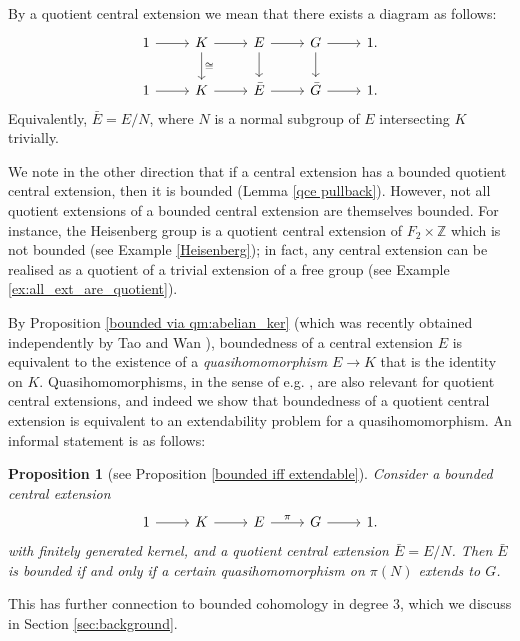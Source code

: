 \documentclass[svgnames]{amsart}
\theoremstyle{plain}
\newtheorem{prop}[thm]{Proposition}
\theoremstyle{definition}
\begin{document}
By a quotient central extension we mean that there exists a diagram as follows:
$$\begin{tikzcd}
    1\ar{r}&K \ar{r}\ar[d,"\cong"]&E\ar{r}\ar[d]&G\ar{r}\ar[d]&1.\\
    1\ar{r}& K\ar{r}&\bar E\ar{r}&\bar G\ar{r}&1.
\end{tikzcd}$$
Equivalently, $\bar E = E/N$, where $N$ is a normal subgroup of $E$ intersecting $K$ trivially.

We note in the other direction that if a central extension has a bounded quotient central extension, then it is bounded (Lemma \ref{qce pullback}). However, not all quotient extensions of a bounded central extension are themselves bounded. For instance, the Heisenberg group is a quotient central extension of $F_2\times \mathbb Z$ which is not bounded (see Example \ref{Heisenberg}); in fact, any central extension can be realised as a quotient of a trivial extension of a free group (see Example \ref{ex:all_ext_are_quotient}).

By Proposition \ref{bounded via qm:abelian_ker} (which was recently obtained independently by Tao and Wan \cite[Lemma 5.5]{tao2025properactionsfiniteproducts}), boundedness of a central extension $E$ is equivalent to the existence of a \emph{quasihomomorphism} $E\to K$ that is the identity on $K$. Quasihomomorphisms, in the sense of e.g. \cite{fujikapo}, are also relevant for quotient central extensions, and indeed we show that boundedness of a quotient central extension is equivalent to an extendability problem for a quasihomomorphism. An informal statement is as follows:

\begin{prop}[see Proposition \ref{bounded iff extendable}]
    \label{propintro:bounded-iff-ext}
    Consider a bounded central extension
    $$\begin{tikzcd}
    1\ar{r}& K \ar{r}&E\ar[r,"\pi"]&G\ar{r}&1.
\end{tikzcd}$$
with finitely generated kernel, and a quotient central extension $\bar E=E/N$. Then $\bar E$ is bounded if and only if a certain quasihomomorphism on $\pi(N)$ extends to $G$.
\end{prop}
This has further connection to bounded cohomology in degree 3, which we discuss in Section \ref{sec:background}. 
\end{document}
